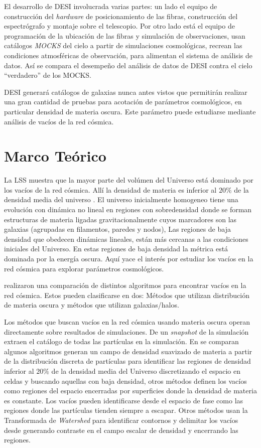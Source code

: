 \documentclass[preprint]{aastex62}
\begin{document}
  El desarrollo de DESI involucrada varias partes: un lado el equipo de construcción
  del \textit{hardware} de posicionamiento de las fibras, construcción del espectrógrafo y
  montaje sobre el telescopio. Por otro lado está el equipo de programación de la ubicación
  de las fibras y simulación de observaciones, usan catálogos \textit{MOCKS} del cielo a
  partir de simulaciones cosmológicas, recrean las condiciones atmosféricas 
  de observación, para alimentan el sistema
  de análisis de datos. Así se compara el desempeño del análisis de datos de DESI contra
  el cielo ``verdadero'' de los MOCKS.

  DESI generará catálogos de galaxias nunca antes vistos 
  que permitirán realizar una gran cantidad de pruebas para acotación de parámetros cosmológicos,
  en particular densidad de materia oscura. Este parámetro puede estudiarse mediante análisis
  de vacíos de la red cósmica.


  \section{Marco Teórico}

  La LSS muestra que la mayor parte del volúmen del Universo está dominado
  por los vacíos de la red cósmica. Allí la densidad de materia es inferior al $20\%$ de la
  densidad media del universo \citep{Weygaert2014}.
  El universo inicialmente homogeneo tiene una evolución con dinámica no lineal en regiones
  con sobredensidad donde se forman estructuras  de materia ligadas gravitacionalmente
  cuyos marcadores son las galaxias (agrupadas en filamentos, paredes y nodos),
  Las regiones de baja densidad que obedecen dinámicas lineales, están más cercanas a
  las condiciones iniciales del Universo. En estas regiones de baja densidad la métrica está
  dominada por la energía oscura. Aquí yace el interés por estudiar los vacíos en la
  red cósmica para explorar parámetros cosmológicos.
  
  \citet{Aspen-Amsterdam2008} realizaron una comparación de distintos algoritmos para encontrar vacíos
  en la red cósmica. Estos pueden clasificarse en dos: Métodos que utilizan distribución de materia
  oscura y métodos que utilizan galaxias/halos.

  Los métodos que buscan vacíos en la red cósmica usando materia oscura operan directamente sobre
  resultados de simulaciones. De un \textit{snapshot} de la simulación extraen el catálogo de todas
  las partículas en la simulación. En \citet{Aspen-Amsterdam2008} se comparan algunos algoritmos
  generan un campo de densidad suavizado de materia a partir de la distribución discreta de partículas
  para identificar las regiones de  densidad inferior al $20\%$ de la densidad media del Universo
  discretizando el espacio en celdas y buscando aquellas con baja densidad, 
  otros métodos definen los vacíos como regiones del espacio encerradas por superficies
  donde la densidad de materia es constante.  Los vacíos pueden identificarse desde el espacio de
  fase como las regiones donde las partículas tienden siempre a escapar. Otros métodos usan la
  Transformada de \textit{Watershed} para identificar contornos y delimitar los vacíos desde
  generando contraste en el campo escalar de densidad y encerrando las regiones.
\end{document}
